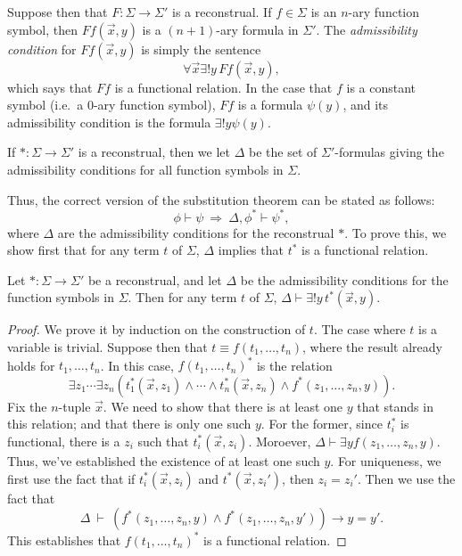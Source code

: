 Suppose then that $F:\Sigma\to\Sigma '$ is a reconstrual.  If
$f\in \Sigma$ is an $n$-ary function symbol, then $Ff(\vec{x},y)$ is a
$(n+1)$-ary formula in $\Sigma '$.  The \emph{admissibility condition}
for $Ff(\vec{x},y)$ is simply the sentence
\[ \forall \vec{x}\exists !y\, Ff(\vec{x},y) ,\] which says that $Ff$
is a functional relation.  In the case that $f$ is a constant symbol
(i.e.\ a $0$-ary function symbol), $Ff$ is a formula $\psi (y)$, and
its admissibility condition is the formula $\exists !y\psi (y)$.

\begin{defn} If $\ast :\Sigma\to\Sigma '$ is a reconstrual, then we
  let $\Delta$ be the set of $\Sigma '$-formulas giving the
  admissibility conditions for all function symbols in
  $\Sigma$. \end{defn}

Thus, the correct version of the substitution theorem can be stated as
follows:
\[ \phi\vdash\psi \: \Longrightarrow \: \Delta ,\phi ^*\vdash \psi ^*
  ,\] where $\Delta$ are the admissibility conditions for the
reconstrual $*$.  To prove this, we show first that for any term $t$
of $\Sigma$, $\Delta$ implies that $t^*$ is a functional relation.

\begin{lemma} Let $\ast :\Sigma\to\Sigma '$ be a reconstrual, and let
  $\Delta$ be the admissibility conditions for the function symbols in
  $\Sigma$.  Then for any term $t$ of $\Sigma$,
  $\Delta\vdash\exists !y \, t^*(\vec{x},y)$. \end{lemma}

\begin{proof} We prove it by induction on the construction of $t$.
  The case where $t$ is a variable is trivial.  Suppose then that
  $t\equiv f(t_1,\dots ,t_n)$, where the result already holds for
  $t_1,\dots ,t_n$.  In this case, $f(t_1,\dots ,t_n)^*$ is the
  relation
  \[ \exists z_1\cdots \exists z_n(t_1^*(\vec{x},z_1)\wedge
    \cdots\wedge t_n^*(\vec{x},z_n)\wedge f^*(z_1,\dots ,z_n,y)) .\]
  Fix the $n$-tuple $\vec{x}$.  We need to show that there is at least
  one $y$ that stands in this relation; and that there is only one
  such $y$.  For the former, since $t_i^*$ is functional, there is a
  $z_i$ such that $t_i^*(\vec{x},z_i)$.  Moroever,
  $\Delta\vdash \exists y f(z_1,\dots ,z_n,y)$.  Thus, we've
  established the existence of at least one such $y$.  For uniqueness,
  we first use the fact that if $t^*_i(\vec{x},z_i)$ and
  $t^*(\vec{x},z_i')$, then $z_i=z_i'$.  Then we use the fact that
  \[ \Delta \:\vdash \: (f^*(z_1,\dots ,z_n,y)\wedge f^*(z_1,\dots
    ,z_n,y'))\to y=y' .\] This establishes that $f(t_1,\dots ,t_n)^*$
  is a functional relation.  \end{proof}

